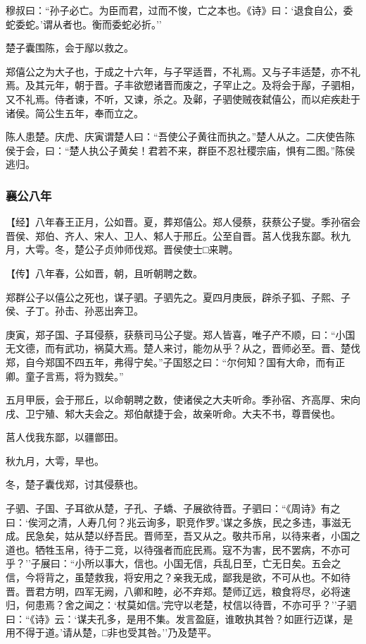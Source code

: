 \documentclass[]{article}
\begin{document}
穆叔曰：``孙子必亡。为臣而君，过而不悛，亡之本也。《诗》曰：`退食自公，委蛇委蛇。'谓从者也。衡而委蛇必折。''

楚子囊围陈，会于鄬以救之。

郑僖公之为大子也，于成之十六年，与子罕适晋，不礼焉。又与子丰适楚，亦不礼焉。及其元年，朝于晋。子丰欲愬诸晋而废之，子罕止之。及将会于鄬，子驷相，又不礼焉。侍者谏，不听，又谏，杀之。及鄵，子驷使贼夜弑僖公，而以疟疾赴于诸侯。简公生五年，奉而立之。

陈人患楚。庆虎、庆寅谓楚人曰：``吾使公子黄往而执之。''楚人从之。二庆使告陈侯于会，曰：``楚人执公子黄矣！君若不来，群臣不忍社稷宗庙，惧有二图。''陈侯逃归。

\hypertarget{header-n1901}{%
\subsubsection{襄公八年}\label{header-n1901}}

【经】八年春王正月，公如晋。夏，葬郑僖公。郑人侵蔡，获蔡公子燮。季孙宿会晋侯、郑伯、齐人、宋人、卫人、邾人于邢丘。公至自晋。莒人伐我东鄙。秋九月，大雩。冬，楚公子贞帅师伐郑。晋侯使士□来聘。

【传】八年春，公如晋，朝，且听朝聘之数。

郑群公子以僖公之死也，谋子驷。子驷先之。夏四月庚辰，辟杀子狐、子熙、子侯、子丁。孙击、孙恶出奔卫。

庚寅，郑子国、子耳侵蔡，获蔡司马公子燮。郑人皆喜，唯子产不顺，曰：``小国无文德，而有武功，祸莫大焉。楚人来讨，能勿从乎？从之，晋师必至。晋、楚伐郑，自今郑国不四五年，弗得宁矣。''子国怒之曰：``尔何知？国有大命，而有正卿。童子言焉，将为戮矣。''

五月甲辰，会于邢丘，以命朝聘之数，使诸侯之大夫听命。季孙宿、齐高厚、宋向戌、卫宁殖、邾大夫会之。郑伯献捷于会，故亲听命。大夫不书，尊晋侯也。

莒人伐我东鄙，以疆鄫田。

秋九月，大雩，旱也。

冬，楚子囊伐郑，讨其侵蔡也。

子驷、子国、子耳欲从楚，子孔、子蟜、子展欲待晋。子驷曰：``《周诗》有之曰：`俟河之清，人寿几何？兆云询多，职竞作罗。'谋之多族，民之多违，事滋无成。民急矣，姑从楚以纾吾民。晋师至，吾又从之。敬共币帛，以待来者，小国之道也。牺牲玉帛，待于二竞，以待强者而庇民焉。寇不为害，民不罢病，不亦可乎？''子展曰：``小所以事大，信也。小国无信，兵乱日至，亡无日矣。五会之信，今将背之，虽楚救我，将安用之？亲我无成，鄙我是欲，不可从也。不如待晋。晋君方明，四军无阙，八卿和睦，必不弃郑。楚师辽远，粮食将尽，必将速归，何患焉？舍之闻之：`杖莫如信。'完守以老楚，杖信以待晋，不亦可乎？''子驷曰：``《诗》云：`谋夫孔多，是用不集。发言盈庭，谁敢执其咎？如匪行迈谋，是用不得于道。'请从楚，□非也受其咎。''乃及楚平。
\end{document}
